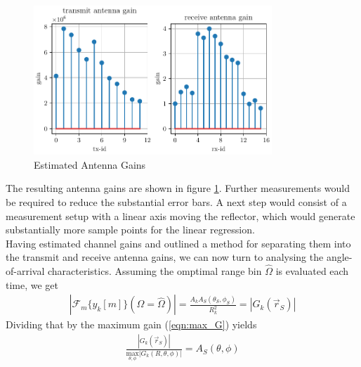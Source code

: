 \begin{figure}
    \centering
    \includegraphics[width=0.8\textwidth]{../figures/antenna_gains.pdf}
    \caption{Estimated Antenna Gains}
    \label{fig:antenna_gains}
\end{figure}
The resulting antenna gains are shown in figure \ref{fig:antenna_gains}.
Further measurements would be required to reduce the substantial error bars.
A next step would consist of a measurement setup with a linear axis moving the reflector,
which would generate substantially more sample points for the linear regression. \\

Having estimated channel gains and outlined a method for separating them into the transmit and receive antenna gains,
we can now turn to analysing the angle-of-arrival characteristics.
Assuming the omptimal range bin $\hat \Omega$ is evaluated each time, we get
\begin{align}
    \left|\mathcal{F}_m\{y_k[m]\}(\Omega = \hat \Omega)  \right| =  \frac{A_kA_S(\theta_S,\phi_S)}{R_{k}^2} =  |G_k(\vec r_S)|
\end{align}
Dividing that by the maximum gain (\ref{eqn:max_G}) yields
\begin{align}
    \frac {|G_k(\vec r_S)|}{\underset{\theta,\phi}{\text{max}} |G_k(R,\theta,\phi)|}  = A_S(\theta,\phi)
\end{align}

